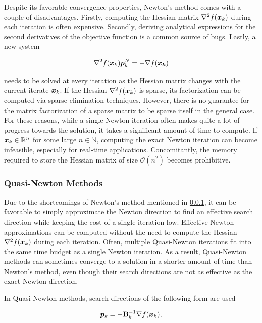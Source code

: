 Despite its favorable convergence properties, Newton's method comes with a couple of disadvantages. Firstly, computing the Hessian matrix
$\nabla^2 f(\bm{x}_k)$ during each iteration is often expensive. Secondly, deriving analytical expressions for the second derivatives of 
the objective function is a common source of bugs. Lastly, a new system 

\[
    \nabla^2 f(\bm{x}_k) \bm{p}^N_k = - \nabla f(\bm{x_k})
\]

\noindent needs to be solved at every iteration as the Hessian matrix changes with the current iterate $\bm{x}_k$.
If the Hessian $\nabla^2 f(\bm{x}_k)$ is sparse, its factorization can be computed via sparse elimination techniques. However, there is no
guarantee for the matrix factorization of a sparse matrix to be sparse itself in the general case.
For these reasons, while a single
Newton iteration often makes quite a lot of progress towards the solution, it takes a significant amount of time to compute. If $\bm{x}_k
\in \mathbb{R}^n$ for some large $n \in \mathbb{N}$, computing the exact Newton iteration can become infeasible, especially for real-time
applications. Concomitantly, the memory required to store the Hessian matrix of size $\mathcal{O}(n^2)$ becomes prohibitive.

\subsubsection{Quasi-Newton Methods}\label{sss:quasi-newton}
Due to the shortcomings of Newton's method mentioned in \cref{sss:quasi-newton}, it can be favorable to simply approximate the Newton 
direction
to find an effective search direction while keeping the cost of a single iteration low. Effective Newton approximations can be 
computed without the need to compute the Hessian $\nabla^2 f(\bm{x}_k)$ during each iteration. Often, multiple Quasi-Newton 
iterations fit into the same time budget as a single Newton iteration. As a result, Quasi-Newton methods can sometimes converge to a 
solution in a shorter amount of time than Newton's method, even though their search directions are not as effective as the exact 
Newton direction.

In Quasi-Newton methods, search directions of the following form are used

\begin{equation}\label{eq:quasi-newton-direction}
    \bm{p}_k = -\mathbf{B}^{-1}_k \nabla f(\bm{x}_k),
\end{equation}

